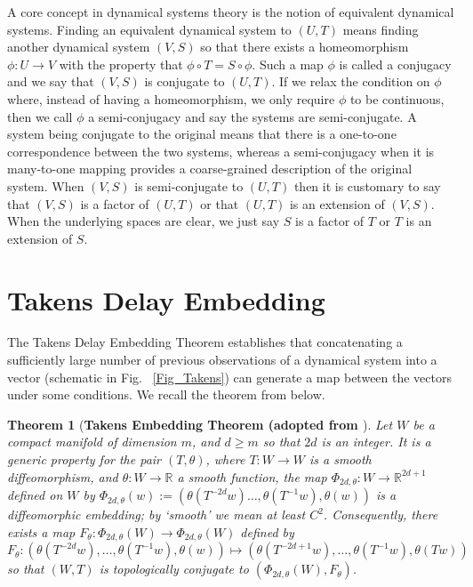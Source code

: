 \documentclass[12 pt]{article}
\newtheorem{Theorem}{Theorem}[]
\begin{document}
 A core concept in dynamical systems theory is the notion of equivalent dynamical systems.
Finding an equivalent dynamical system to $(U,T)$ means finding another dynamical system $(V,S)$ so that there exists a homeomorphism $\phi:U \to V$ with the property that  $\phi \circ T=S\circ \phi$. Such a map $\phi$ is called a  conjugacy and we say that $(V,S)$ is conjugate to $(U,T)$. If we relax the condition on $\phi$ where, instead of having a homeomorphism, we only require $\phi$ to be continuous, then we call $\phi$ a semi-conjugacy and say the systems are semi-conjugate. A system being conjugate to the original means that there is a one-to-one correspondence between the two systems, whereas a semi-conjugacy when it is many-to-one mapping provides a coarse-grained description of the original system. When  $(V,S)$ is semi-conjugate to $(U,T)$ then it is customary to say that $(V,S)$ is a factor of $(U,T)$ or that $(U,T)$ is an  extension of $(V,S)$. When the underlying spaces are clear, we just say $S$ is a factor of $T$ or $T$ is an extension of $S$. 







\section{Takens Delay Embedding}
The Takens Delay Embedding Theorem establishes that concatenating a sufficiently large number of previous observations of a dynamical system into a vector (schematic in Fig. ~\ref{Fig_Takens}) can generate a map between the vectors under some conditions. We recall the theorem from \cite{takens1981detecting} below.  


\begin{Theorem} 
	[\bf Takens Embedding Theorem (adopted from \cite{takens1981detecting}] \label{Thm_Takens}
            Let $W$ be a compact manifold of dimension $m$, and $d\ge m$ so that $2d$ is an integer. It is a 
            generic property for the pair $(T, \theta)$,  where $T:W \to W$ is
            a smooth diffeomorphism, and $\theta:W \to \mathbb{R}$ a smooth function, the map $\Phi_{2d,\theta}:W \to \mathbb{R}^{2d+1}$ defined on $W$ by 
            $\Phi_{2d,\theta}(w) := (\theta(T^{-2d}w)\ldots,\theta(T^{-1}w),\theta(w))$
            is a diffeomorphic embedding; by `smooth' we mean at least $C^2$. Consequently, there exists a map $F_\theta: \Phi_{2d,\theta}(W) \to \Phi_{2d,\theta}(W)$ defined by $$F_\theta: (\theta(T^{-2d}w),\ldots,\theta(T^{-1}w),\theta(w)) \mapsto 
            (\theta(T^{-2d+1}w),\ldots,\theta(T^{-1}w),\theta(Tw))$$
           so that $(W,T)$ is topologically conjugate to 
            $(\Phi_{2d,\theta}(W), F_\theta)$. 
\end{Theorem} 
\end{document}
